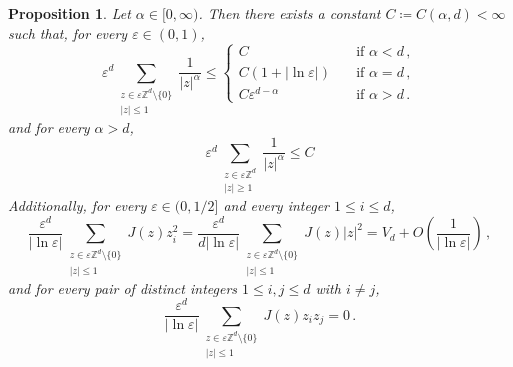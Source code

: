 \documentclass[11pt]{amsart}
\theoremstyle{plain}
\newtheorem{proposition}[theorem]{Proposition}
\theoremstyle{definition}
\theoremstyle{remark}
\newcommand{\Zd}{\mathbb{Z}^d}
\newcommand{\eps}{\varepsilon}
\begin{document}
	\begin{proposition} \label{sumesonthelattice}
		Let $\alpha \in [0,\infty)$. Then there exists a constant $C \coloneqq C(\alpha, d) < \infty$ such that, for every $\eps \in (0,1)$,
		\begin{equation}
			\label{e.lattice.upper}
			\eps^d \sum_{\substack{z \in \eps \Zd \setminus \{0\} \\ |z| \leq 1 }} \frac{1}{|z|^\alpha} \leq
			\left\{ \begin{aligned}
				C  &\quad\text{if }\alpha < d\,, \\
				C (1 + \left| \ln \eps \right|) &\quad\text{if }\alpha = d\,, \\
				C \eps^{d - \alpha} &\quad\text{if }\alpha > d\,.
			\end{aligned} \right.
		\end{equation}
		and for every $\alpha > d$,
		\begin{equation} \label{e.lattice.upperlong}
			\eps^d \sum_{\substack{z \in \eps \Zd \\ |z| \geq 1 }} \frac{1}{|z|^\alpha} \leq C
		\end{equation} 
		Additionally, for every $\eps \in (0,1/2]$ and every integer $1 \le i \le d$,
		\begin{equation}
			\label{e.lattice.diagonal}
			\frac{\eps^d}{\left| \ln \eps \right|} \sum_{\substack{z \in \eps \Zd \setminus \{0\} \\ |z| \leq 1}} J(z)  z_i^2 = \frac{\eps^d}{d \left| \ln \eps \right|} \sum_{\substack{z \in \eps \Zd \setminus \{0\} \\ |z| \leq 1}} J(z)  |z|^2 =  V_d + O\left(\frac{1}{\left| \ln \eps \right|}\right)\,,
		\end{equation}
		and for every pair of distinct integers $1 \le i, j \le d$ with $i \ne j$,
		\begin{equation}
			\label{e.lattice.mixed}
			\frac{\eps^d}{\left| \ln \eps \right|} \sum_{\substack{z \in \eps \Zd \setminus \{0\} \\ |z| \leq 1}} J(z) z_i z_j = 0\,.
		\end{equation}
	\end{proposition}
	
\end{document}
